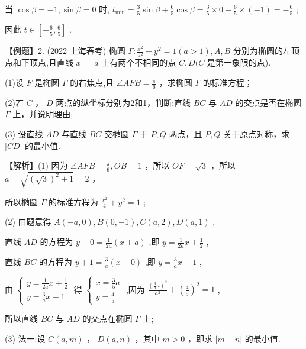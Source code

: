 \documentclass[10pt]{article}
\begin{document}
当 \(\cos \beta  =  - 1,\sin \beta  = 0\) 时, \({t}_{\min } = \frac{3}{5}\sin \beta  + \frac{6}{5}\cos \beta  = \frac{3}{5} \times  0 + \frac{6}{5} \times  \left( {-1}\right)  =  - \frac{6}{5}\) ;

因此 \(t \in  \left\lbrack  {-\frac{6}{5},\frac{6}{5}}\right\rbrack\) .

【例题】2. (2022 上海春考) 椭圆 \(\Gamma  : \frac{{x}^{2}}{{a}^{2}} + {y}^{2} = 1\left( {a > 1}\right) ,A,B\) 分别为椭圆的左顶点和下顶点,且直线 \(x \; = a\) 上有两个不相同的点 \(C,D(C\) 是第一象限的点).

(1)设 \(F\) 是椭圆 \(\Gamma\) 的右焦点,且 \(\angle {AFB} = \frac{\pi }{6}\) ，求椭圆 \(\Gamma\) 的标准方程；

(2)若 \(C\) ， \(D\) 两点的纵坐标分别为2和1，判断:直线 \({BC}\) 与 \({AD}\) 的交点是否在椭圆 \(\Gamma\) 上，并说明理由;

(3) 设直线 \({AD}\) 与直线 \({BC}\) 交椭圆 \(\Gamma\) 于 \(P,Q\) 两点，且 \(P,Q\) 关于原点对称，求 \(\left| {CD}\right|\) 的最小值.

【解析】(1) 因为 \(\angle {AFB} = \frac{\pi }{6},{OB} = 1\) ，所以 \({OF} = \sqrt{3}\) ，所以 \(a = \sqrt{{\left( \sqrt{3}\right) }^{2} + 1} = 2\) ，

所以椭圆 \(\Gamma\) 的标准方程为 \(\frac{{x}^{2}}{4} + {y}^{2} = 1\) ;

(2) 由题意得 \(A\left( {-a,0}\right) ,B\left( {0, - 1}\right) ,C\left( {a,2}\right) ,D\left( {a,1}\right)\) ,

直线 \({AD}\) 的方程为 \(y - 0 = \frac{1}{2a}\left( {x + a}\right)\) ,即 \(y = \frac{1}{2a}x + \frac{1}{2}\) ,

直线 \({BC}\) 的方程为 \(y + 1 = \frac{3}{a}\left( {x - 0}\right)\) ,即 \(y = \frac{3}{a}x - 1\) ,

由 \(\left\{  \begin{array}{l} y = \frac{1}{2a}x + \frac{1}{2} \\  y = \frac{3}{a}x - 1 \end{array}\right.\) 得 \(\left\{  \begin{array}{l} x = \frac{3}{5}a \\  y = \frac{4}{5} \end{array}\right.\) ,因为 \(\frac{{\left( \frac{3}{5}a\right) }^{2}}{{a}^{2}} + {\left( \frac{4}{5}\right) }^{2} = 1\) ,

所以直线 \({BC}\) 与 \({AD}\) 的交点在椭圆 \(\Gamma\) 上;

(3) 法一:设 \(C\left( {a,m}\right)\) ， \(D\left( {a,n}\right)\) ，其中 \(m > 0\) ，即求 \(\left| {m - n}\right|\) 的最小值.
\end{document}
